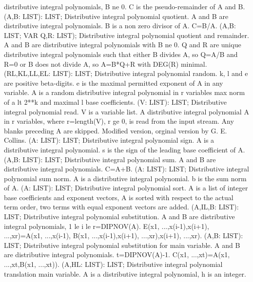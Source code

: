distributive integral polynomials, B ne 0. C is the
pseudo-remainder of A and B.  \ecom 
{} (A,B: LIST): LIST; \eproc
\bcom Distributive integral polynomial quotient. A and B are
distributive integral polynomials. B is a non zero divisor
of A. C=B/A. \ecom 
{} (A,B: LIST; VAR Q,R: LIST); \eproc
\bcom Distributive integral polynomial quotient and remainder.
A and B are distributive integral polynomials with B ne 0.
Q and R are unique distributive integral polynomials such
that either B divides A, so Q=A/B and R=0  or B does not
divide A, so A=B*Q+R with DEG(R) minimal. \ecom 
{} (RL,KL,LL,EL: LIST): LIST; \eproc
\bcom Distributive integral polynomial random.
k, l and e are positive beta-digits. e is the
maximal permitted exponent of A in any variable. A is a
random distributive integral polynomial in r variables
max norm of a lt 2**k and maximal l base coefficients.  \ecom 
{} (V: LIST): LIST; \eproc
\bcom Distributive integral polynomial read. V is a variable list.
A distributive integral polynomial A in r variables, where
r=length(V), r ge 0, is read from the input stream. Any
blanks preceding A are skipped. Modified version, orginal
version by G. E. Collins.  \ecom 
{} (A: LIST): LIST; \eproc
\bcom Distributive integral polynomial sign. A is a distributive
integral polynomial. s is the sign of the leading base
coefficient of A. \ecom 
{} (A,B: LIST): LIST; \eproc
\bcom Distributive integral polynomial sum. A and B are
distributive integral polynomials. C=A+B.  \ecom 
{} (A: LIST): LIST; \eproc
\bcom Distributive integral polynomial sum norm. A is a distributive
integral polynomial. b is the sum norm of A. \ecom 
{} (A: LIST): LIST; \eproc
\bcom Distributive integral polynomial sort. A is a
list of integer base coefficients and exponent vectors,
A is sorted with respect to the actual term order,
two terms with equal exponent vectors are added.  \ecom 
{} (A,IL,B: LIST): LIST; \eproc
\bcom Distributive integral polynomial substitution. A and B are
distributive integral polynomials, 1 le i le r=DIPNOV(A).
E(x1, ...,x(i-1),x(i+1), ...,xr)=A(x1, ...,x(i-1),
B(x1, ...,x(i-1),x(i+1), ...,xr),x(i+1), ...,xr).  \ecom 
{} (A,B: LIST): LIST; \eproc
\bcom Distributive integral polynomial substitution for main variable.
A and B are distributive integral polynomials. t=DIPNOV(A)-1.
C(x1, ...,xt)=A(x1, ...,xt,B(x1, ...,xt)).  \ecom 
{} (A,HL: LIST): LIST; \eproc
\bcom Distributive integral polynomial translation main variable.
A is a distributive integral polynomial, h is an integer.
